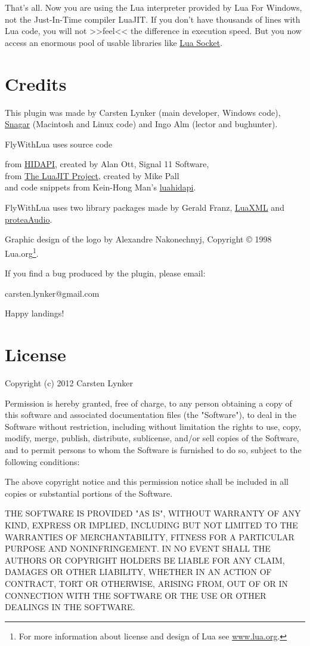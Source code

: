 \documentclass[11pt,parskip=half,a4paper]{scrartcl}
\begin{document}
That's all. Now you are using the Lua interpreter provided by Lua For Windows, not the Just-In-Time compiler LuaJIT. If you don't have thousands of lines with Lua code, you will not >>feel<< the difference in execution speed. But you now access an enormous pool of usable libraries like \href{http://w3.impa.br/~diego/software/luasocket/}{Lua Socket}.

\newpage
\section{Credits}

This plugin was made by Carsten Lynker (main developer, Windows code), \href{http://www.snagar.org/}{Snagar} (Macintosh and Linux code) and Ingo Alm (lector and bughunter).

FlyWithLua uses source code

from \href{http://www.signal11.us/oss/hidapi/}{HIDAPI}, created by Alan Ott, Signal 11 Software,\\
from \href{http://luajit.org/}{The LuaJIT Project}, created by Mike Pall\\
and code snippets from Kein-Hong Man's \href{https://sites.google.com/site/rubblepiles/hardware-stuff}{luahidapi}.

FlyWithLua uses two library packages made by Gerald Franz, \href{http://viremo.eludi.net/LuaXML/index.html}{LuaXML} and \href{http://viremo.eludi.net/proteaAudio/proteaaudiolua.html}{proteaAudio}.

Graphic design of the logo by Alexandre Nakonechnyj, Copyright © 1998 Lua.org\footnote{For more information about license and design of Lua see \url{www.lua.org}.}.

If you find a bug produced by the plugin, please email:

carsten.lynker@gmail.com

Happy landings!

\section{License}

Copyright (c) 2012 Carsten Lynker

Permission is hereby granted, free of charge, to any person obtaining a copy of this software and associated documentation files (the "Software"), to deal in the Software without restriction, including without limitation the rights to use, copy, modify, merge, publish, distribute, sublicense, and/or sell copies of the Software, and to permit persons to whom the Software is furnished to do so, subject to the following conditions:

The above copyright notice and this permission notice shall be included in all copies or substantial portions of the Software.

THE SOFTWARE IS PROVIDED "AS IS", WITHOUT WARRANTY OF ANY KIND, EXPRESS OR IMPLIED, INCLUDING BUT NOT LIMITED TO THE WARRANTIES OF MERCHANTABILITY, FITNESS FOR A PARTICULAR PURPOSE AND NONINFRINGEMENT. IN NO EVENT SHALL THE AUTHORS OR COPYRIGHT HOLDERS BE LIABLE FOR ANY CLAIM, DAMAGES OR OTHER LIABILITY, WHETHER IN AN ACTION OF CONTRACT, TORT OR OTHERWISE, ARISING FROM, OUT OF OR IN CONNECTION WITH THE SOFTWARE OR THE USE OR OTHER DEALINGS IN THE SOFTWARE.
\end{document}
